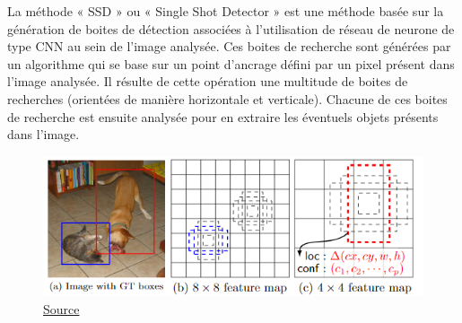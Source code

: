 \documentclass[a4paper,12pt]{article} %
\begin{document}
La méthode « SSD » ou « Single Shot Detector » est une méthode basée sur la génération de boites de détection associées à l’utilisation de réseau de neurone de type CNN au sein de l’image analysée. 
Ces boites de recherche sont générées par un algorithme qui se base sur un point d’ancrage défini par un pixel présent dans l’image analysée.  Il résulte de cette opération une multitude de boites de recherches (orientées de manière horizontale et verticale). Chacune de ces boites de recherche est ensuite analysée pour en extraire les éventuels objets présents dans l’image.\newline 
\begin{figure}[h] %
  \centering %
  \includegraphics[scale=0.80]{ssd.png} %
   \caption{\href{https://towardsdatascience.com/review-ssd-single-shot-detector-object-detection-851a94607d11}{Source} }
\end{figure}

\newpage
\end{document}
